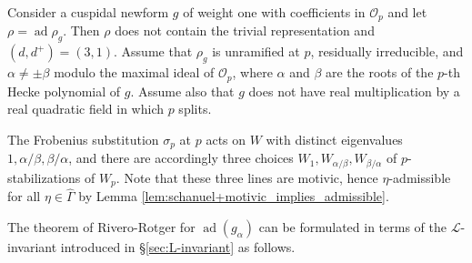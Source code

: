 \documentclass[12pt]{amsart}
\newcommand\cL{\mathcal{L}}
\newcommand\cO{\mathcal{O}}
\DeclareMathOperator{\ad}{ad}
\theoremstyle{defstyle}
\theoremstyle{thmstyle}
\begin{document}
Consider a cuspidal newform $g$ of weight one with coefficients in $\cO_p$ and let $\rho=\ad \rho_g$. Then $\rho$ does not contain the trivial representation and $(d,d^+)=(3,1)$. Assume that $\rho_g$ is unramified at $p$, residually irreducible, and $\alpha\neq \pm\beta$ modulo the maximal ideal of $\cO_p$, where $\alpha$ and $\beta$ are the roots of the $p$-th Hecke polynomial of $g$. Assume also that $g$ does not have real multiplication by a real quadratic field in which $p$ splits.

The Frobenius substitution $\sigma_p$ at $p$ acts on $W$ with distinct eigenvalues $1,\alpha/\beta,\beta/\alpha$, and there are accordingly three choices $W_1,W_{\alpha/\beta},W_{\beta/\alpha}$ of $p$-stabilizations of $W_p$. Note that these three lines are motivic, hence $\eta$-admissible for all $\eta\in\widehat{\Gamma}$ by Lemma \ref{lem:schanuel+motivic_implies_admissible}. 

The theorem of Rivero-Rotger for $\ad (g_\alpha)$ can be formulated in terms of the $\cL$-invariant introduced in \S\ref{sec:L-invariant} as follows.
\end{document}
